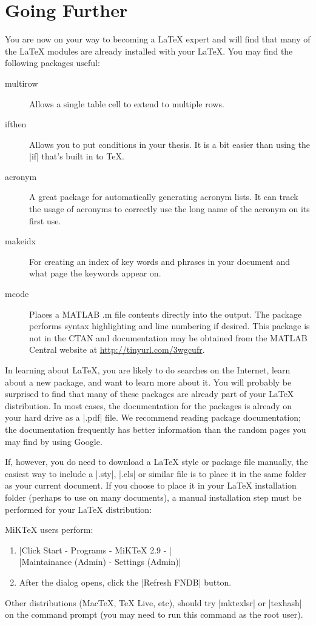\section{Going Further}
You are now on your way to becoming a \LaTeX{} expert and will find that many of the \LaTeX{} modules are already installed with your \LaTeX{}. 
You may find the following packages useful:

\begin{description}
\item[multirow] Allows a single table cell to extend to multiple
rows.

\item[ifthen]  Allows you to put conditions in your thesis. It is a
bit easier than using the |if| that's built in to \TeX.

\item[acronym]  A great package for automatically generating acronym lists.
It can track the usage of acronyms to correctly use the long name of the acronym
on its first use.

\item[makeidx]  For creating an index of key words and phrases in your document and what page the keywords appear on.

\item[mcode]  Places a MATLAB .m file contents directly into the output.  The
package performs syntax highlighting and line numbering if desired.  This package is not in the CTAN
and documentation may be obtained from the MATLAB Central website at \url{http://tinyurl.com/3wgcufr}.

\end{description}

In learning about \LaTeX{}, you are likely to do searches on the Internet, learn
about a new package, and want to learn more about it. You will
probably be surprised to find that many of these packages are already
part of your \LaTeX{} distribution. In most cases, the documentation for
the packages is already on your hard drive as a |.pdf| file.  We
recommend reading package documentation; the documentation frequently
has better information than the random pages you may find by using Google.

If, however, you do need to download a \LaTeX{} style or package file manually, 
the easiest way to include a |.sty|, |.cls| or similar file is to place it in the same folder as your current document.  If you choose to place it in your LaTeX installation folder (perhaps to use on many documents), a manual installation step must be performed for your \LaTeX{} distribution:

MiKTeX users perform:
\begin{enumerate}
  \item |Click Start - Programs - MiKTeX 2.9 - | \\ 
    |Maintainance (Admin) - Settings (Admin)|
  \item After the dialog opens, click the |Refresh FNDB| button.
\end{enumerate}

Other distributions (MacTeX, TeX Live, etc), should try |mktexlsr| or |texhash| on the command prompt (you may need to run this command as the root user).

